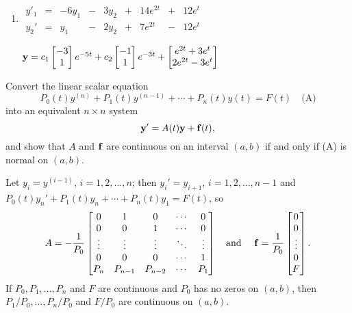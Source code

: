 \documentclass{ximera}
\begin{document}
\begin{problem}
\begin{enumerate}
\item %
 $\begin{array}{ccccccccc}
 y'_1&=&-6y_1&-&3y_2&+&14e^{2t}&+&12e^t \\
y_2'&=&y_1&-&2y_2&+&7e^{2t}&-&12e^t\end{array}$

${\bf y}=c_1\begin{bmatrix}-3\\1\end{bmatrix}e^{-5t}+c_2\begin{bmatrix}-1\\1\end{bmatrix}e^{-3t}+
\begin{bmatrix}e^{2t}+3e^t\\2e^{2t}-3e^t\end{bmatrix}$

\end{enumerate}
\end{problem}

\begin{problem}\label{exer:10.2.6}
Convert the linear scalar equation
$$
P_0(t)y^{(n)}+P_1(t)y^{(n-1)}+\cdots+P_n(t)y(t)=F(t)
\quad\text{(A)}
$$
into an equivalent $n\times n$ system
$$
{\bf y'}=A(t){\bf y}+{\bf f}(t),
$$
and show that $A$ and ${\bf f}$ are continuous on an interval
$(a,b)$ if and only if (A) is normal on $(a,b)$.

\begin{solution}
    Let  $y_i=y^{(i-1)}$, $i=1,2,\dots,n$; then $y_i'=y_{i+1}$,
$i=1,2,\dots,n-1$ and $P_0(t)y_n'+P_1(t)y_n+\cdots+P_n(t)y_1=F(t)$, so
$$A=-\frac{1}{ P_0}
\begin{bmatrix}
0&1&0&\cdots&0\\
0&0&1&\cdots&0\\
\vdots&\vdots&\vdots&\ddots&\vdots\\
0&0&0&\cdots&1\\
P_n&P_{n-1}&P_{n-2}&\cdots&P_1
\end{bmatrix}
\mbox{\quad and \quad}
{\bf f}=\frac{1}{ P_0}
\begin{bmatrix}
0\\ 0\\\vdots\\0\\F
\end{bmatrix}.
$$
If $P_0,P_1,\dots,P_n$ and $F$ are continuous and $P_0$
has no zeros on $(a,b)$, then $P_1/P_0,\dots,P_n/P_0$  and
$F/P_0$ are continuous on $(a,b)$.
\end{solution}

\end{problem}
\end{document}
